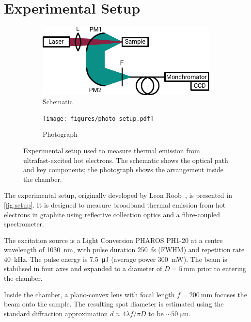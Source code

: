 \documentclass[
	a4paper,
]{scrarticle}
\begin{document}
\section{Experimental Setup}
\begin{figure}[h]
    \centering
    \begin{subfigure}{3.5in}
        \centering
        \includegraphics{figures/setup.pdf}
        \caption{Schematic}
    \end{subfigure}\hfill
    \begin{subfigure}{2in}
        \centering
        \texttt{[image: figures/photo\_setup.pdf]}
        \caption{Photograph}
    \end{subfigure}
    \caption{Experimental setup used to measure thermal emission from ultrafast-excited hot electrons. The schematic shows the optical path and key components; the photograph shows the arrangement inside the chamber.}
    \label{fig:setup}
\end{figure}

The experimental setup, originally developed by Leon Roob~\cite{roobThermalRadiationUltrafast2025}, is presented in \autoref{fig:setup}. It is designed to measure broadband thermal emission from hot electrons in graphite using reflective collection optics and a fibre-coupled spectrometer.

The excitation source is a Light Conversion PHAROS PH1-20 at a centre wavelength of \SI{1030}{\nano\metre}, with pulse duration \SI{250}{\femto\second} (FWHM) and repetition rate \SI{40}{\kilo\hertz}. The pulse energy is \SI{7.5}{\micro\joule} (average power \SI{300}{\milli\watt}). The beam is stabilised in four axes and expanded to a diameter of $D=\SI{5}{\milli\metre}$ prior to entering the chamber.

Inside the chamber, a plano-convex lens with focal length \(f=\SI{200}{\milli\metre}\) focuses the beam onto the sample. The resulting spot diameter is estimated using the standard diffraction approximation \(d \approx 4\lambda f / \pi D\) to be \(\sim\SI{50}{\micro\metre}\).
\end{document}
